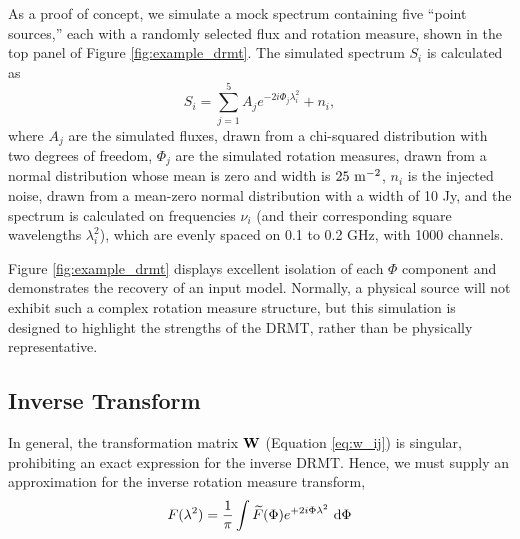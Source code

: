 As a proof of concept, we simulate a mock spectrum containing five ``point sources,'' each with a
randomly selected flux and rotation measure, shown in the top panel of Figure
\ref{fig:example_drmt}. The simulated spectrum $S_i$ is calculated as
\begin{equation}
  S_i = \sum_{j=1}^5 A_je^{-2i\Phi_j\lambda_i^2} + n_i,
\end{equation}
where $A_j$ are the simulated fluxes, drawn from a chi-squared distribution with two degrees of
freedom, $\Phi_j$ are the simulated rotation measures, drawn from a normal distribution whose mean
is zero and width is $25\ {\rm m}^{-2}$, $n_i$ is the injected noise, drawn from a mean-zero normal
distribution with a width of 10 Jy, and the spectrum is calculated on frequencies $\nu_i$ (and their
corresponding square wavelengths $\lambda_i^2$), which are evenly spaced on 0.1 to 0.2 GHz, with
1000 channels.

Figure \ref{fig:example_drmt} displays excellent isolation of each $\Phi$ component and demonstrates
the recovery of an input model. Normally, a physical source will not exhibit such a complex rotation
measure structure, but this simulation is designed to highlight the strengths of the DRMT, rather
than be physically representative.

\subsection{Inverse Transform}

In general, the transformation matrix $\mathbf{W}$ (Equation \ref{eq:w_ij}) is singular, prohibiting an
exact expression for the inverse DRMT. Hence, we must supply an approximation for the inverse
rotation measure transform,
\begin{equation}
  F(\lambda^2) = \frac{1}{\pi}\int \widetilde{F}(\Phi)e^{+2i\Phi\lambda^2}\ \mathrm{d}\Phi
  \label{eq:def_iRMT}
\end{equation}

